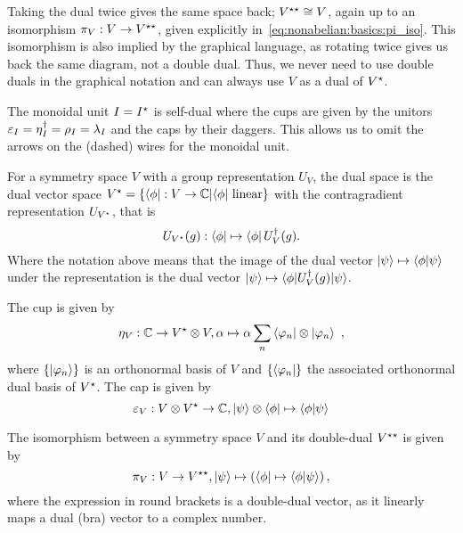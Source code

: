 Taking the dual twice gives the same space back; $V^{\star\star} \cong V$, again up to an isomorphism $\pi_V: V \to V^{\star\star}$, given explicitly in~\eqref{eq:nonabelian:basics:pi_iso}.
%
This isomorphism is also implied by the graphical language, as rotating twice gives us back the same diagram, not a double dual.
%
Thus, we never need to use double duals in the graphical notation and can always use $V$ as a dual of $V^\star$.

The monoidal unit $I = I^\star$ is self-dual where the cups are given by the unitors $\varepsilon_I = \eta_I^\dagger = \rho_I = \lambda_I$ and the caps by their daggers.
%
This allows us to omit the arrows on the (dashed) wires for the monoidal unit.


\begin{doublecol}
    For a symmetry space $V$ with a group representation $U_V$, the dual space is the dual vector space $\dualspace{V} = \setdef{\bra{\phi}: V \to \Cbb}{\bra{\phi}\text{ linear}}$ with the contragradient representation $U_{V^\star}$, that is
    \begin{equation}
        \label{nonabelian:basics:contragradient_representation}
        U_{\dualspace{V}}(g)
        : \bra{\phi} \mapsto \bra{\phi} \hconj{U_V}(g)
        .
    \end{equation}
    Where the notation above means that the image of the dual vector $\ket{\psi} \mapsto \braket{\phi}{\psi}$ under the representation is the dual vector $\ket{\psi} \mapsto \braopket{\phi}{\hconj{U_V}(g)}{\psi}$.

    The cup is given by
    \begin{equation}
        \cupmap{V}
        : \Cbb \to \dualspace{V} \otimes V
        , \alpha \mapsto \alpha \sum_n \bra{\varphi_n} \otimes \ket{\varphi_n}
        ~,
    \end{equation}
    where $\set{\ket{\varphi_n}}$ is an orthonormal basis of $V$ and $\set{\bra{\varphi_n}}$ the associated orthonormal dual basis of $V^\star$.
    The cap is given by
    \begin{equation}
        \capmap{V}
        : V \otimes \dualspace{V} \to \Cbb
        , \ket{\psi} \otimes \bra{\phi} \mapsto \braket{\phi}{\psi}
    \end{equation}

    The isomorphism between a symmetry space $V$ and its double-dual $V^{\star\star}$
    is given by
    \begin{equation}
        \pi_V
        : V \to \doubledualspace{V}
        , \ket{\psi} \mapsto \rBr{\bra{\phi} \mapsto \braket{\phi}{\psi}}
        ,
    \end{equation}
    where the expression in round brackets is a double-dual vector, as it linearly maps a dual (bra) vector to a complex number.


\end{doublecol}
